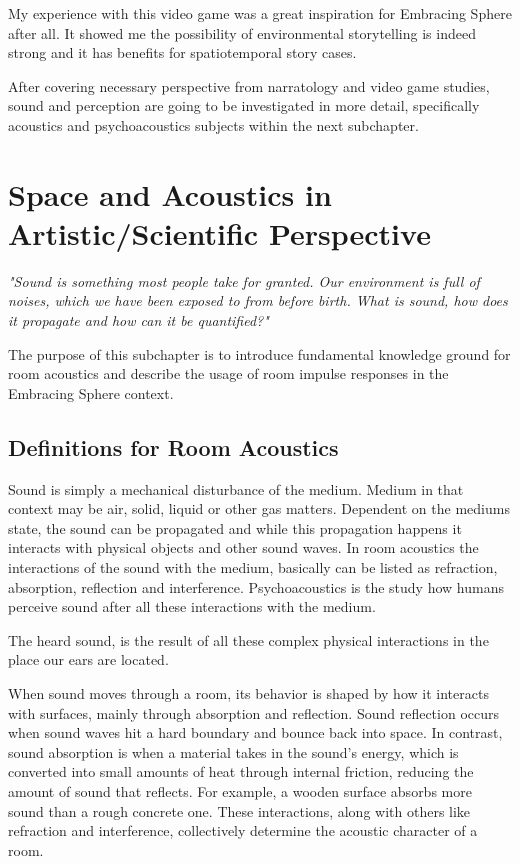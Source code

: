             My experience with this video game was a great inspiration for Embracing Sphere after all. It showed me the possibility of environmental storytelling is indeed strong and it has benefits for spatiotemporal story cases.\par

            After covering necessary perspective from narratology and video game studies, sound and perception are going to be investigated in more detail, specifically acoustics and psychoacoustics subjects within the next subchapter.
    \section{Space and Acoustics in Artistic/Scientific Perspective}
            \emph{"Sound is something most people take for granted. Our environment is full of noises, which we have been exposed to from before birth. What is sound, how does it propagate and how can it be quantified?"\cite{Acoustics_and_Psychophysics}}\par 

            The purpose of this subchapter is to introduce fundamental knowledge ground for room acoustics and describe the usage of room impulse responses in the Embracing Sphere context.\par
        \subsection{Definitions for Room Acoustics}
            Sound is simply a mechanical disturbance of the medium. Medium in that context may be air, solid, liquid or other gas matters. Dependent on the mediums state, the sound can be propagated and while this propagation happens it interacts with physical objects and other sound waves. In room acoustics the interactions of the sound with the medium, basically can be listed as refraction, absorption, reflection and interference. Psychoacoustics is the study how humans perceive sound after all these interactions with the medium\cite{Acoustics_and_Psychophysics}.\par

            The heard sound, is the result of all these complex physical interactions in the place our ears are located.\par

            When sound moves through a room, its behavior is shaped by how it interacts with surfaces, mainly through absorption and reflection. Sound reflection occurs when sound waves hit a hard boundary and bounce back into space. In contrast, sound absorption is when a material takes in the sound's energy, which is converted into small amounts of heat through internal friction, reducing the amount of sound that reflects\cite{Acoustics_and_Psychophysics}. For example, a wooden surface absorbs more sound than a rough concrete one. These interactions, along with others like refraction and interference, collectively determine the acoustic character of a room.\par

